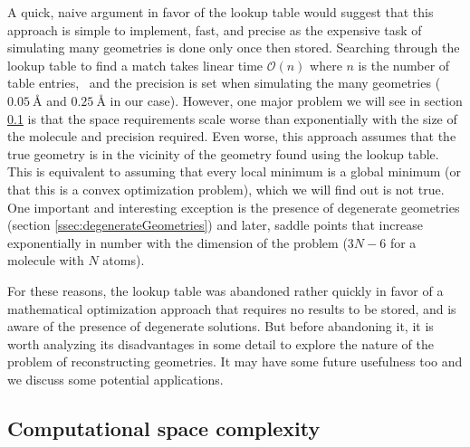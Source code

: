 A quick, naive argument in favor of the lookup table would suggest that this approach is simple to implement, fast, and precise as the expensive task of simulating many geometries is done only once then stored. Searching through the lookup table to find a match takes linear time $\mathcal{O}(n)$ where $n$ is the number of table entries,\footnotemark~ and the precision is set when simulating the many geometries ($\SI{0.05}{\angstrom}$ and $\SI{0.25}{\angstrom}$ in our case). However, one major problem we will see in section \ref{ssec:LTspace} is that the space requirements scale worse than exponentially with the size of the molecule and precision required. Even worse, this approach assumes that the true geometry is in the vicinity of the geometry found using the lookup table. This is equivalent to assuming that every local minimum is a global minimum (or that this is a convex optimization problem), which we will find out is not true. One important and interesting exception is the presence of degenerate geometries (section \ref{ssec:degenerateGeometries}) and later, saddle points that increase exponentially in number with the dimension of the problem ($3N-6$ for a molecule with $N$ atoms).


For these reasons, the lookup table was abandoned rather quickly in favor of a mathematical optimization approach that requires no results to be stored, and is aware of the presence of degenerate solutions. But before abandoning it, it is worth analyzing its disadvantages in some detail to explore the nature of the problem of reconstructing geometries. It may have some future usefulness too and we discuss some potential applications.

\subsection{Computational space complexity} \label{ssec:LTspace}

